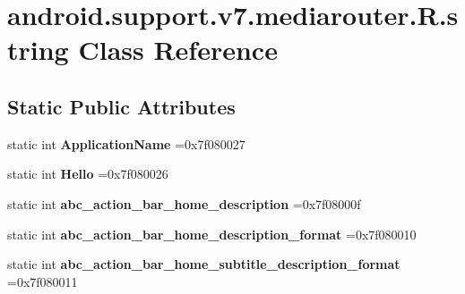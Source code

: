 \hypertarget{classandroid_1_1support_1_1v7_1_1mediarouter_1_1R_1_1string}{}\section{android.\+support.\+v7.\+mediarouter.\+R.\+string Class Reference}
\label{classandroid_1_1support_1_1v7_1_1mediarouter_1_1R_1_1string}
\subsection*{Static Public Attributes}
\begin{DoxyCompactItemize}
\item 
\mbox{\label{classandroid_1_1support_1_1v7_1_1mediarouter_1_1R_1_1string_a13c9bd4c516b038ecd3e4c60a071a195}} 
static int {\bfseries Application\+Name} =0x7f080027
\item 
\mbox{\label{classandroid_1_1support_1_1v7_1_1mediarouter_1_1R_1_1string_a560f631726f05871e76f4bfc113a56f0}} 
static int {\bfseries Hello} =0x7f080026
\item 
\mbox{\label{classandroid_1_1support_1_1v7_1_1mediarouter_1_1R_1_1string_a50b8b6205fa8de365f5e08f0cc44e94d}} 
static int {\bfseries abc\+\_\+action\+\_\+bar\+\_\+home\+\_\+description} =0x7f08000f
\item 
\mbox{\label{classandroid_1_1support_1_1v7_1_1mediarouter_1_1R_1_1string_a545a5138c2dc05305c53d531be12ea4e}} 
static int {\bfseries abc\+\_\+action\+\_\+bar\+\_\+home\+\_\+description\+\_\+format} =0x7f080010
\item 
\mbox{\label{classandroid_1_1support_1_1v7_1_1mediarouter_1_1R_1_1string_ae177640b669d68ddcb1c04e4648e362f}} 
static int {\bfseries abc\+\_\+action\+\_\+bar\+\_\+home\+\_\+subtitle\+\_\+description\+\_\+format} =0x7f080011
\item 
\mbox{\label{classandroid_1_1support_1_1v7_1_1mediarouter_1_1R_1_1string_a94dd7655092a1dee33d4cd5da2386079}} 

\end{DoxyCompactItemize}
